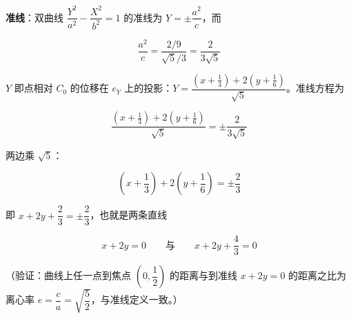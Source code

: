 \begin{answer}
\textbf{准线}：双曲线 $\dfrac{Y^2}{a^2}-\dfrac{X^2}{b^2}=1$ 的准线为 $Y=\pm\dfrac{a^2}{c}$，而

\nopagebreak[4]
\[
\frac{a^2}{c}=\frac{2/9}{\sqrt5/3}=\frac{2}{3\sqrt5}
\]

$Y$ 即点相对 $C_0$ 的位移在 $e_Y$ 上的投影：$Y=\dfrac{(x+\frac13)+2(y+\frac16)}{\sqrt5}$。准线方程为

\nopagebreak[4]
\[
\frac{\left(x+\frac13\right)+2\left(y+\frac16\right)}{\sqrt5}=\pm\frac{2}{3\sqrt5}
\]

两边乘 $\sqrt5$：

\nopagebreak[4]
\[
\left(x+\frac13\right)+2\left(y+\frac16\right)=\pm\frac23
\]

即 $x+2y+\dfrac23=\pm\dfrac23$，也就是两条直线

\nopagebreak[4]
\[
x+2y=0\qquad\text{与}\qquad x+2y+\frac43=0
\]

（验证：曲线上任一点到焦点 $\left(0,\dfrac12\right)$ 的距离与到准线 $x+2y=0$ 的距离之比为离心率 $e=\dfrac ca=\sqrt{\dfrac52}$，与准线定义一致。）


\end{answer}
